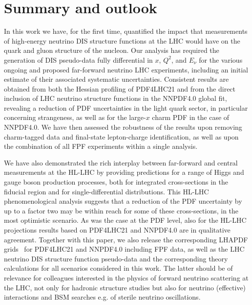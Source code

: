 \clearpage
\section{Summary and outlook}
\label{sec:summary}

In this work we have, for the first time,
quantified the impact that measurements of high-energy
neutrino DIS structure functions at the LHC would have on the quark
and gluon structure of the nucleon.
%
Our analysis has required the generation of
DIS pseudo-data fully differential in $x$, $Q^2$, and $E_\nu$
for the various ongoing and proposed far-forward
neutrino LHC experiments, including an initial estimate
of their associated systematic uncertainties.
%
Consistent results are obtained from both the Hessian profiling
of PDF4LHC21 and from the direct inclusion of LHC neutrino
structure functions in the NNPDF4.0 global
fit, revealing a reduction of PDF uncertainties in the
light quark sector, in particular concerning strangeness, as well
as for the large-$x$ charm PDF in the case of NNPDF4.0.
%
We have then assessed the  robustness of the results upon
removing charm-tagged data and final-state lepton-charge
identification, as well as upon the combination
of all FPF experiments within a single analysis.

We have also demonstrated the rich interplay between
far-forward and central measurements
at the HL-LHC by providing predictions
for a range of Higgs and gauge boson production processes,
both for integrated cross-sections in the fiducial region and for
single-differential distributions.
%
This HL-LHC phenomenological analysis suggests that a reduction
of the  PDF uncertainty by up to a factor two
may be within reach for some of these cross-sections,
in the most optimistic scenario.
%
As was the case at the PDF level, also for 
the HL-LHC projections results based on  PDF4LHC21 and NNPDF4.0
are in qualitative agreement.
%
Together with this paper, we also
release the corresponding {\sc\small LHAPDF} grids~\cite{Buckley:2014ana}
for PDF4LHC21 and NNPDF4.0 including FPF data,
as well as the LHC neutrino DIS structure function pseudo-data
and the corresponding theory
calculations for all scenarios considered in this work.
%
The latter should be of relevance for colleagues interested in the physics
of forward
neutrino scattering at the LHC, not only for hadronic structure studies
but also for neutrino (effective)
interactions and BSM searches e.g. of sterile neutrino oscillations.

